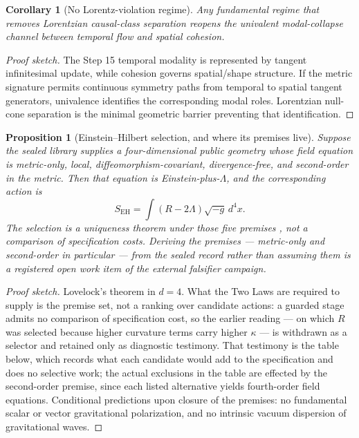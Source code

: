 \documentclass[11pt]{article}
\theoremstyle{plain}
\newtheorem{proposition}[theorem]{Proposition}
\newtheorem{corollary}[theorem]{Corollary}
\theoremstyle{definition}
\theoremstyle{remark}
\newenvironment{proofsketch}{\begin{proof}[Proof sketch]}{\end{proof}}
\begin{document}
\begin{corollary}[No Lorentz-violation regime]
Any fundamental regime that removes Lorentzian causal-class separation reopens the univalent modal-collapse channel between temporal flow and spatial cohesion.
\end{corollary}

\begin{proofsketch}
The Step 15 temporal modality is represented by tangent infinitesimal update, while cohesion governs spatial/shape structure. If the metric signature permits continuous symmetry paths from temporal to spatial tangent generators, univalence identifies the corresponding modal roles. Lorentzian null-cone separation is the minimal geometric barrier preventing that identification.
\end{proofsketch}

\begin{proposition}[Einstein--Hilbert selection, and where its premises live]
Suppose the sealed library supplies a four-dimensional public geometry whose field equation is metric-only, local, diffeomorphism-covariant, divergence-free, and second-order in the metric. Then that equation is Einstein-plus-\(\Lambda\), and the corresponding action is
\[
S_{\mathrm{EH}}=\int (R-2\Lambda)\sqrt{-g}\,d^4x .
\]
The selection is a uniqueness theorem under those five premises \cite{lovelock}, not a comparison of specification costs. Deriving the premises --- metric-only and second-order in particular --- from the sealed record rather than assuming them is a registered open work item of the external falsifier campaign.
\end{proposition}

\begin{proofsketch}
Lovelock's theorem in \(d=4\). What the Two Laws are required to supply is the premise set, not a ranking over candidate actions: a guarded stage admits no comparison of specification cost, so the earlier reading --- on which \(R\) was selected because higher curvature terms carry higher \(\kappa\) --- is withdrawn as a selector and retained only as diagnostic testimony. That testimony is the table below, which records what each candidate would add to the specification and does no selective work; the actual exclusions in the table are effected by the second-order premise, since each listed alternative yields fourth-order field equations. Conditional predictions upon closure of the premises: no fundamental scalar or vector gravitational polarization, and no intrinsic vacuum dispersion of gravitational waves.
\end{proofsketch}
\end{document}
